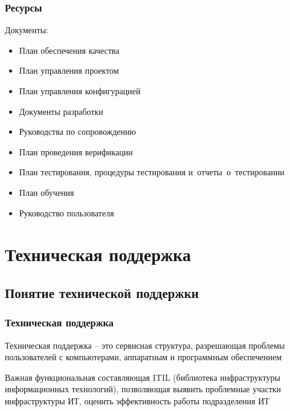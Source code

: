 \documentclass{../industrial-development}
\begin{document}
\begin{frame} \frametitle{Ресурсы}
	Документы:
	\begin{itemize}
		\item План обеспечения качества
		\item План управления проектом 
		\item План управления конфигурацией 
		\item Документы разработки 
		\item Руководства по сопровождению 
		\item План проведения верификации 
		\item План тестирования, процедуры тестирования и~отчеты~о~тестировании 
		\item План обучения 
		\item Руководство пользователя
	\end{itemize}
	
\end{frame}

\lecturenotes



\section{Техническая поддержка}

\subsection{Понятие технической поддержки}

\begin{frame} \frametitle{Техническая поддержка}
	\begin{definition} 
		\alert {Техническая поддержка} -- это сервисная структура, разрешающая проблемы пользователей с компьютерами, аппаратным и программным обеспечением
	\end{definition}
	Важная функциональная составляющая ITIL (библиотека инфраструктуры информационных технологий), позволяющая выявить проблемные участки инфраструктуры ИТ, оценить эффективность работы подразделения ИТ
\end{frame}
\lecturenotes
\end{document}
